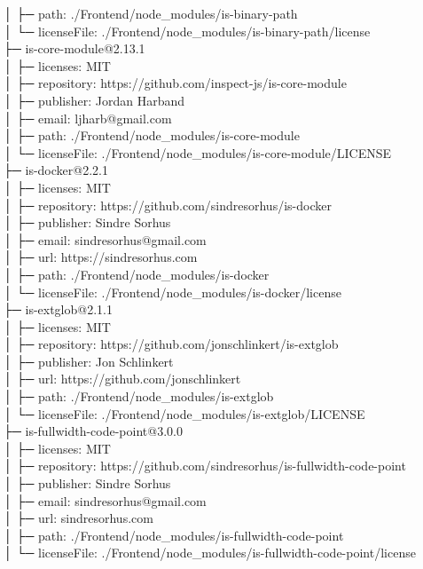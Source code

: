 │  ├─ path: ./Frontend/node\_modules/is-binary-path\\
│  └─ licenseFile: ./Frontend/node\_modules/is-binary-path/license\\
├─ is-core-module@2.13.1\\
│  ├─ licenses: MIT\\
│  ├─ repository: https://github.com/inspect-js/is-core-module\\
│  ├─ publisher: Jordan Harband\\
│  ├─ email: ljharb@gmail.com\\
│  ├─ path: ./Frontend/node\_modules/is-core-module\\
│  └─ licenseFile: ./Frontend/node\_modules/is-core-module/LICENSE\\
├─ is-docker@2.2.1\\
│  ├─ licenses: MIT\\
│  ├─ repository: https://github.com/sindresorhus/is-docker\\
│  ├─ publisher: Sindre Sorhus\\
│  ├─ email: sindresorhus@gmail.com\\
│  ├─ url: https://sindresorhus.com\\
│  ├─ path: ./Frontend/node\_modules/is-docker\\
│  └─ licenseFile: ./Frontend/node\_modules/is-docker/license\\
├─ is-extglob@2.1.1\\
│  ├─ licenses: MIT\\
│  ├─ repository: https://github.com/jonschlinkert/is-extglob\\
│  ├─ publisher: Jon Schlinkert\\
│  ├─ url: https://github.com/jonschlinkert\\
│  ├─ path: ./Frontend/node\_modules/is-extglob\\
│  └─ licenseFile: ./Frontend/node\_modules/is-extglob/LICENSE\\
├─ is-fullwidth-code-point@3.0.0\\
│  ├─ licenses: MIT\\
│  ├─ repository: https://github.com/sindresorhus/is-fullwidth-code-point\\
│  ├─ publisher: Sindre Sorhus\\
│  ├─ email: sindresorhus@gmail.com\\
│  ├─ url: sindresorhus.com\\
│  ├─ path: ./Frontend/node\_modules/is-fullwidth-code-point\\
│  └─ licenseFile: ./Frontend/node\_modules/is-fullwidth-code-point/license\\
